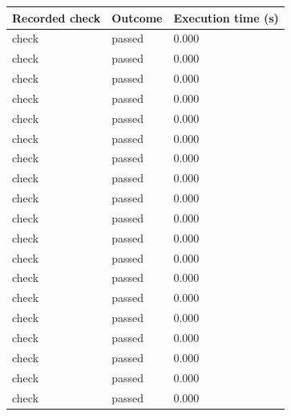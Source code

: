 \documentclass[11pt,a4paper]{article}
\begin{document}
{\small\renewcommand{\arraystretch}{1.18}\begin{longtable}{@{}L{0.57\textwidth}|L{0.16\textwidth}|L{0.17\textwidth}@{}}\toprule

\textbf{Recorded check} & \textbf{Outcome} & \textbf{Execution time (\allowbreak{}s)\allowbreak{}}\\\midrule\endhead

check & passed & 0.000\\[2pt]\hline

check & passed & 0.000\\[2pt]\hline

check & passed & 0.000\\[2pt]\hline

check & passed & 0.000\\[2pt]\hline

check & passed & 0.000\\[2pt]\hline

check & passed & 0.000\\[2pt]\hline

check & passed & 0.000\\[2pt]\hline

check & passed & 0.000\\[2pt]\hline

check & passed & 0.000\\[2pt]\hline

check & passed & 0.000\\[2pt]\hline

check & passed & 0.000\\[2pt]\hline

check & passed & 0.000\\[2pt]\hline

check & passed & 0.000\\[2pt]\hline

check & passed & 0.000\\[2pt]\hline

check & passed & 0.000\\[2pt]\hline

check & passed & 0.000\\[2pt]\hline

check & passed & 0.000\\[2pt]\hline

check & passed & 0.000\\[2pt]\hline

check & passed & 0.000\\[2pt]\hline

\bottomrule\end{longtable}}
\end{document}
